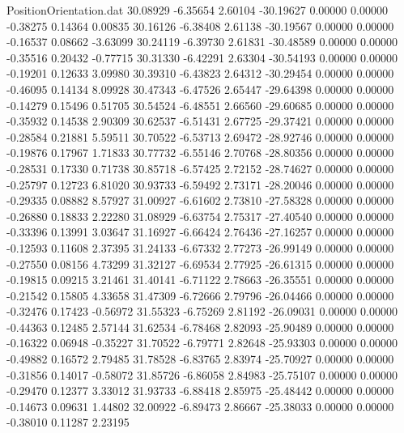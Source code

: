 \begin{filecontents}{PositionOrientation.dat}
  30.08929   -6.35654    2.60104   -30.19627    0.00000    0.00000   -0.38275    0.14364    0.00835
  30.16126   -6.38408    2.61138   -30.19567    0.00000    0.00000   -0.16537    0.08662   -3.63099
  30.24119   -6.39730    2.61831   -30.48589    0.00000    0.00000   -0.35516    0.20432   -0.77715
  30.31330   -6.42291    2.63304   -30.54193    0.00000    0.00000   -0.19201    0.12633    3.09980
  30.39310   -6.43823    2.64312   -30.29454    0.00000    0.00000   -0.46095    0.14134    8.09928
  30.47343   -6.47526    2.65447   -29.64398    0.00000    0.00000   -0.14279    0.15496    0.51705
  30.54524   -6.48551    2.66560   -29.60685    0.00000    0.00000   -0.35932    0.14538    2.90309
  30.62537   -6.51431    2.67725   -29.37421    0.00000    0.00000   -0.28584    0.21881    5.59511
  30.70522   -6.53713    2.69472   -28.92746    0.00000    0.00000   -0.19876    0.17967    1.71833
  30.77732   -6.55146    2.70768   -28.80356    0.00000    0.00000   -0.28531    0.17330    0.71738
  30.85718   -6.57425    2.72152   -28.74627    0.00000    0.00000   -0.25797    0.12723    6.81020
  30.93733   -6.59492    2.73171   -28.20046    0.00000    0.00000   -0.29335    0.08882    8.57927
  31.00927   -6.61602    2.73810   -27.58328    0.00000    0.00000   -0.26880    0.18833    2.22280
  31.08929   -6.63754    2.75317   -27.40540    0.00000    0.00000   -0.33396    0.13991    3.03647
  31.16927   -6.66424    2.76436   -27.16257    0.00000    0.00000   -0.12593    0.11608    2.37395
  31.24133   -6.67332    2.77273   -26.99149    0.00000    0.00000   -0.27550    0.08156    4.73299
  31.32127   -6.69534    2.77925   -26.61315    0.00000    0.00000   -0.19815    0.09215    3.21461
  31.40141   -6.71122    2.78663   -26.35551    0.00000    0.00000   -0.21542    0.15805    4.33658
  31.47309   -6.72666    2.79796   -26.04466    0.00000    0.00000   -0.32476    0.17423   -0.56972
  31.55323   -6.75269    2.81192   -26.09031    0.00000    0.00000   -0.44363    0.12485    2.57144
  31.62534   -6.78468    2.82093   -25.90489    0.00000    0.00000   -0.16322    0.06948   -0.35227
  31.70522   -6.79771    2.82648   -25.93303    0.00000    0.00000   -0.49882    0.16572    2.79485
  31.78528   -6.83765    2.83974   -25.70927    0.00000    0.00000   -0.31856    0.14017   -0.58072
  31.85726   -6.86058    2.84983   -25.75107    0.00000    0.00000   -0.29470    0.12377    3.33012
  31.93733   -6.88418    2.85975   -25.48442    0.00000    0.00000   -0.14673    0.09631    1.44802
  32.00922   -6.89473    2.86667   -25.38033    0.00000    0.00000   -0.38010    0.11287    2.23195

\end{filecontents}
